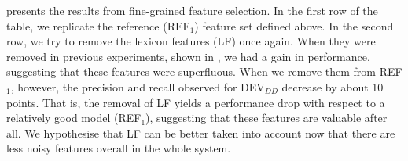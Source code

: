 \documentclass[output=paper,
modfonts
]{langscibook}
\begin{document}
 presents the results from fine-grained feature selection.
In the first row of the table, we replicate the reference (\textsc{REF$_1$}) feature set defined above.
In the second row, we try to remove the lexicon features (\textsc{LF}) once again. When they were removed in previous experiments, shown in , we had a gain in performance, suggesting that these features were superfluous. When we remove them from \textsc{REF$_1$}, however, the precision and recall observed for \textsc{DEV}$_{DD}$ decrease by about 10 points. That is, the removal of \textsc{LF} yields a performance drop with respect to a relatively good model (\textsc{REF$_1$}), suggesting that these features are valuable after all. We hypothesise that \textsc{LF} can be better taken into account now that there are less noisy features overall in the whole system.
\end{document}
